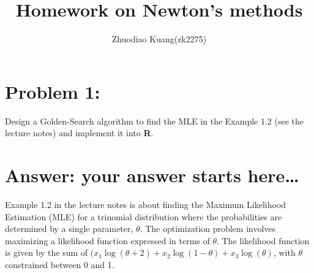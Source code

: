 \documentclass[
]{article}
\title{Homework on Newton's methods}
\author{Zhuodiao Kuang(zk2275)}
\date{}
\begin{document}
\maketitle

\hypertarget{problem-1}{%
\section{Problem 1:}\label{problem-1}}

Design a Golden-Search algorithm to find the MLE in the Example 1.2 (see
the lecture notes) and implement it into \textbf{R}.

\hypertarget{answer-your-answer-starts-here}{%
\section{Answer: your answer starts
here\ldots{}}\label{answer-your-answer-starts-here}}

Example 1.2 in the lecture notes is about finding the Maximum Likelihood
Estimation (MLE) for a trinomial distribution where the probabilities
are determined by a single parameter, \(\theta\). The optimization
problem involves maximizing a likelihood function expressed in terms of
\(\theta\). The likelihood function is given by the sum of
\((x_1 \log(\theta + 2) + x_2 \log(1 - \theta) + x_3 \log(\theta)\),
with \(\theta\) constrained between 0 and 1.
\end{document}
